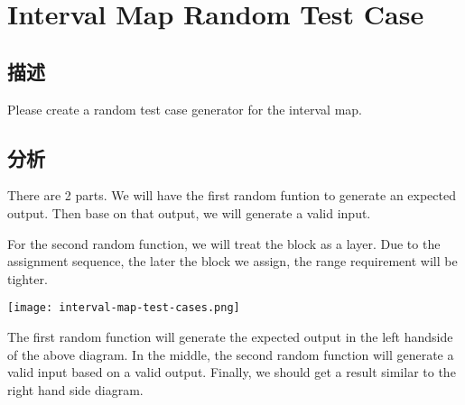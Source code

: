 \section{Interval Map Random Test Case}
\label{sec:interval-map-random-test-case}

\subsection{描述}
Please create a random test case generator for the interval map.


\subsection{分析}
There are 2 parts. We will have the first random funtion to generate an expected output. Then base on that output, we will generate a valid input.

For the second random function, we will treat the block as a layer. Due to the assignment sequence, the later the block we assign, the range requirement will be tighter.

\begin{center}
\texttt{[image: interval-map-test-cases.png]}\\
\label{fig:interval-map-test-cases}
\end{center}

The first random function will generate the expected output in the left handside of the above diagram. In the middle, the second random function will generate a valid input based on a valid output. Finally, we should get a result similar to the right hand side diagram.

